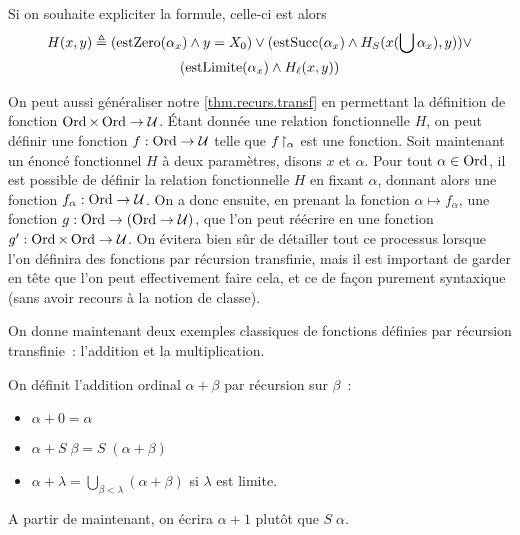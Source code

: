 Si on souhaite expliciter la formule, celle-ci est alors
\begin{multline*}
  H(x,y) \triangleq (\mathrm{estZero}(\alpha_x)\land y = X_0)\lor
  (\mathrm{estSucc}(\alpha_x)\land H_S(x(\bigcup \alpha_x),y))\lor\\
  (\mathrm{estLimite}(\alpha_x)\land H_\ell(x,y))
\end{multline*}

On peut aussi généraliser notre \cref{thm.recurs.transf} en permettant la
définition de fonction $\operatorname{Ord}\times\operatorname{Ord}\to \mathcal U$. \'Etant donnée une
relation fonctionnelle $H$, on peut définir une fonction
$f : \operatorname{Ord} \to \mathcal U$ telle que $f\!\upharpoonright_{\alpha}$ est une fonction. Soit
maintenant un énoncé fonctionnel $H$ à deux paramètres, disons $x$ et $\alpha$.
Pour tout $\alpha\in\operatorname{Ord}$, il est possible de définir la relation fonctionnelle
$H$ en fixant $\alpha$, donnant alors une fonction
$f_\alpha : \operatorname{Ord} \to \mathcal U$. On a donc ensuite, en prenant la fonction
$\alpha \mapsto f_\alpha$, une fonction $g : \operatorname{Ord}\to(\operatorname{Ord}\to\mathcal U)$, que
l'on peut réécrire en une fonction $g' : \operatorname{Ord}\times\operatorname{Ord} \to \mathcal U$. On
évitera bien sûr de détailler tout ce processus lorsque l'on définira des
fonctions par récursion transfinie, mais il est important de garder en tête que
l'on peut effectivement faire cela, et ce de façon purement syntaxique (sans
avoir recours à la notion de classe).

On donne maintenant deux exemples classiques de fonctions définies par récursion
transfinie~: l'addition et la multiplication.

\begin{definition}
  On définit l'addition ordinal $\alpha + \beta$ par récursion sur $\beta$~:
  \begin{itemize}
  \item $\alpha + 0 = \alpha$
  \item $\alpha + S\;\beta = S\;(\alpha + \beta)$
  \item $\displaystyle\alpha+\lambda=\bigcup_{\beta < \lambda}(\alpha+\beta)$
    si $\lambda$ est limite.
  \end{itemize}
\end{definition}

\begin{notation}
  A partir de maintenant, on écrira $\alpha + 1$ plutôt que $S\;\alpha$.
\end{notation}


